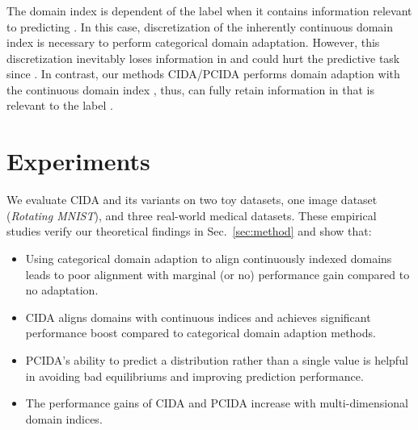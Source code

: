 \documentclass{article}
\newcommand{\secref}[1]{Sec.~\ref{#1}}
\newenvironment{Itemize}{\begin{itemize}\setlength{\itemsep}{0pt}\setlength{\topsep}{0pt}\setlength{\partopsep}{0pt}\setlength{\parskip}{0pt}}{\end{itemize}}
\begin{document}
\subsubsection{}
The domain index  is dependent of the label  when it contains information relevant to predicting .
In this case, discretization of the inherently continuous domain index  is necessary to perform categorical domain adaptation. However, this discretization inevitably loses information in  and could hurt the predictive task since . In contrast, our methods CIDA/PCIDA performs domain adaption with the continuous domain index , thus, can fully retain information in  that is relevant to the label .  \section{Experiments}\label{sec:experiment}
We evaluate CIDA and its variants on two toy datasets, one image dataset (\emph{Rotating MNIST}), and three real-world medical datasets. These empirical studies verify our theoretical findings in \secref{sec:method} and show that:
\begin{Itemize}
\item Using categorical domain adaption to align continuously indexed domains leads to poor alignment with marginal (or no) performance gain compared to no adaptation.\item CIDA aligns domains with continuous indices and achieves significant performance boost compared to categorical domain adaption methods.
\item PCIDA's ability to predict a distribution rather than a single value is helpful in avoiding bad equilibriums and improving prediction performance.
\item  The performance gains of CIDA and PCIDA increase with multi-dimensional domain indices.
\end{Itemize}
\end{document}
